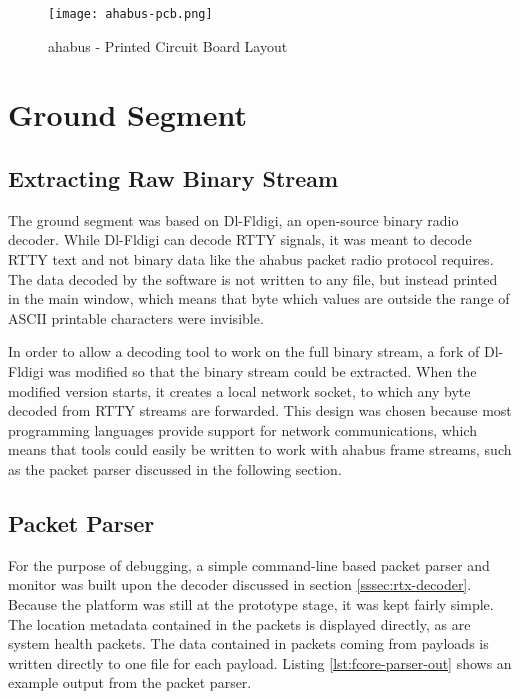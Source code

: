 \begin{figure}[H]
\texttt{[image: ahabus-pcb.png]}
\centering
\caption{\acrshort{ahabus} - Printed Circuit Board Layout}
\label{fig:ahabus-pcb}
\end{figure}

\section{Ground Segment}
\label{sec:ground-segment}

\subsection{Extracting Raw Binary Stream}
\label{sec:binary-extraction}

The ground segment was based on Dl-Fldigi, an open-source binary radio decoder.
While Dl-Fldigi can decode RTTY signals, it was meant to decode RTTY text and
not binary data like the \acrshort{ahabus} packet radio protocol requires.
The data decoded by the software is not written to any file, but instead printed
in the main window, which means that byte which values are outside the range of
ASCII printable characters were invisible.

In order to allow a decoding tool to work on the full binary stream, a fork of
Dl-Fldigi was modified so that the binary stream could be extracted. When the
modified version starts, it creates a local network socket, to which any
byte decoded from RTTY streams are forwarded. This design was chosen because
most programming languages provide support for network communications, which
means that tools could easily be written to work with \acrshort{ahabus} frame streams, such
as the packet parser discussed in the following section.

\subsection{Packet Parser}
\label{sec:packet-dispatcher}

For the purpose of debugging, a simple command-line based packet parser and
monitor was built upon the decoder discussed in section
\ref{sssec:rtx-decoder}. Because the platform was still at the prototype stage,
it was kept fairly simple. The location metadata contained in the packets is
displayed directly, as are system health packets. The data contained in packets
coming from payloads is written directly to one file for each payload. Listing
\ref{lst:fcore-parser-out} shows an example output from the packet parser.

